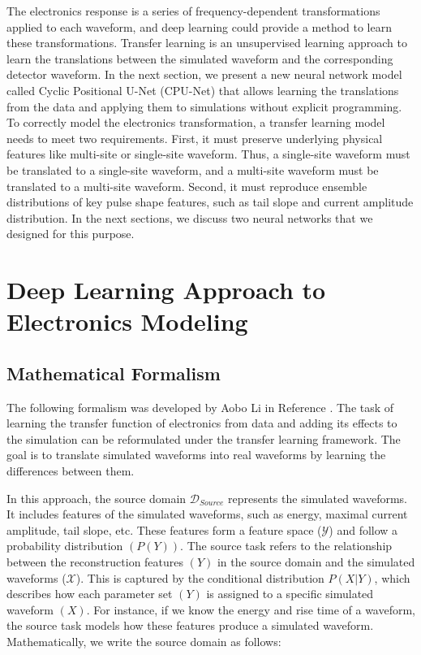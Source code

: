 The electronics response is a series of frequency-dependent transformations applied to each waveform, and deep learning could provide a method to learn these transformations. Transfer learning is an unsupervised learning approach to learn the translations between the simulated waveform and the corresponding detector waveform. In the next section, we present a new neural network model called Cyclic Positional U-Net (CPU-Net) that allows learning the translations from the data and applying them to simulations without explicit programming. To correctly model the electronics transformation, a transfer learning model needs to meet two requirements. First, it must preserve underlying physical features like multi-site or single-site waveform. Thus, a single-site waveform must be translated to a single-site waveform, and a multi-site waveform must be translated to a multi-site waveform. Second, it must reproduce ensemble distributions of key pulse shape features, such as tail slope and current amplitude distribution. In the next sections, we discuss two neural networks that we designed for this purpose.


\section{Deep Learning Approach to Electronics Modeling}
\subsection{Mathematical Formalism}
The following formalism was developed by Aobo Li in Reference \cite{Li_2022jon}. The task of learning the transfer function of electronics from data and adding its effects to the simulation can be reformulated under the transfer learning framework. The goal is to translate simulated waveforms into real waveforms by learning the differences between them.

In this approach, the source domain $\mathcal{D}_{Source}$ represents the simulated waveforms. It includes features of the simulated waveforms, such as energy, maximal current amplitude, tail slope, etc. These features form a feature space ($\mathcal{Y}$) and follow a probability distribution $(P(Y))$. The source task refers to the relationship between the reconstruction features $(Y)$ in the source domain and the simulated waveforms ($\mathcal{X}$). This is captured by the conditional distribution $P(X|Y)$, which describes how each parameter set $(Y)$ is assigned to a specific simulated waveform $(X)$. For instance, if we know the energy and rise time of a waveform, the source task models how these features produce a simulated waveform. Mathematically, we write the source domain as follows:

